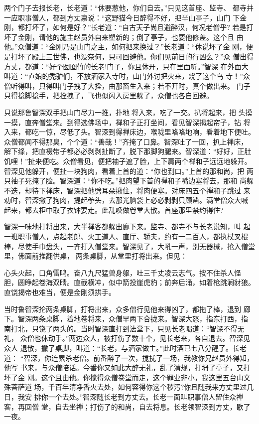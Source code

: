两个门子去报长老，长老道：“休要惹他，你们自去。”只见这首座、监寺、
都寺并一应职事僧人，都到方丈禀说：“这野猫今日醉得不好，把半山亭子，山门
下金刚，都打坏了，如何是好？”长老道：“自古天子尚且避醉汉，何况老僧乎?
若是打坏了金刚，请他的施主赵员外自来塑新的；倒了亭子，也要他修盖。这个且
由他。”众僧道：“金刚乃是山门之主，如何把来换过？”长老道：“休说坏了金
刚，便是打坏了殿上三世佛，也没奈何，只可回避他。你们见前日的行凶么？”众
僧出得方丈，都道：“好个囫囵竹的长老!门子，你且休开，只在里面听。”智深
在外面大叫道：“直娘的秃驴们，不放洒家入寺时，山门外讨把火来，烧了这个鸟
寺！”众僧听得叫，只得叫门子拽了大拴，由那畜生入来；若不开时，真个做出来。
门子只得捻脚捻手，把拴拽了，飞也似闪入房里躲了，众僧也各自回避。

只说那鲁智深双手把山门尽力一推，扑地将入来，吃了一交。扒将起来，把
头摸一摸，直奔僧堂来。到得选佛场中，禅和子正打坐间，看见智深揭起帘子，钻
将入来，都吃一惊，尽低了头。智深到得禅床边，喉咙里咯咯地响，看着地下便吐。
众僧都闻不得那臭，个个道：“善哉！”齐掩了口鼻。智深吐了一回，扒上禅床，
解下绦，把直裰带子都必必剥剥扯断了，脱下那脚狗腿来。智深道：“好好，正肚
饥哩！”扯来便吃。众僧看见，便把袖子遮了脸，上下肩两个禅和子远远地躲开。
智深见他躲开，便扯一块狗肉，看着上首的道：“你也到口。”上首的那和尚，把
两只袖子死掩了脸。智深道：“你不吃。”把肉望下首的禅和子嘴边塞将去，那和
尚躲不迭，却待下禅床，智深把他劈耳朵揪住，将肉便塞。对床四五个禅和子跳过
来劝时，智深撇了狗肉，提起拳头，去那光脑袋上必必剥剥只顾凿。满堂僧众大喊
起来，都去柜中取了衣钵要走。此乱唤做卷堂大散。首座那里禁约得住?

智深一味地打将出来，大半禅客都躲出廊下来。监寺、都寺不与长老说知，叫
起一班职事僧人，点起老郎、火工道人、直厅、轿夫，约有一二百人，都执杖叉棍
棒，尽使手巾盘头，一齐打入僧堂来。智深见了，大吼一声，别无器械，抢入僧堂
里，佛面前推翻供桌，两条桌脚，从堂里打将出来。但见：

心头火起，口角雷鸣。奋八九尺猛兽身躯，吐三千丈凌云志气。按不住杀人怪
胆，圆睁起卷海双睛。直截横冲，似中箭投崖虎豹；前奔后涌，如着枪跳涧豺狼。
直饶揭帝也难当，便是金刚须拱手。

当时鲁智深抡两条桌脚，打将出来，众多僧行见他来得凶了，都拖了棒，退到
廊下。智深两条桌脚，着地卷将来，众僧早两下合拢来。智深大怒，指东打西，指
南打北，只饶了两头的。当时智深直打到法堂下，只见长老喝道：“智深不得无礼，
众僧也休动手。”两边众人，被打伤了数十个，见长老来，各自退去。智深见众人
退散，撇了桌脚，叫道：“长老，与洒家做主。”此时酒已七八分醒了。长老道：
“智深，你连累杀老僧。前番醉了一次，搅扰了一场，我教你兄赵员外得知，他写
书来，与众僧陪话。今番你又如此大醉无礼，乱了清规，打坍了亭子，又打坏了金
刚。这个且由他。你搅得众僧卷堂而走，这个罪业非小，我这里五台山文殊菩萨道
场，千百年清净香火去处，如何容得你这个秽污?你且随我来方丈里过几日，我安
排你一个去处。”智深随长老到方丈去。长老一面叫职事僧人留住众禅客，再回僧
堂，自去坐禅；打伤了的和尚，自去将息。长老领智深到方丈，歇了一夜。

